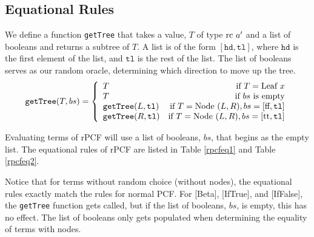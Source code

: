 \begin{table}
\begin{center}
\caption{Equational Rules For rPCF (Continued)} \label{rpcfeq2}
\end{center}
\end{table}

\subsection{Equational Rules}

We define a function \texttt{getTree} that takes a value, $T$ of type $\textrm{rc } a'$ and a list of booleans and returns a subtree of $T$.  A list is of the form $[\texttt{hd},\texttt{tl}]$, where $\texttt{hd}$ is the first element of the list, and $\texttt{tl}$ is the rest of the list.  The list of booleans serves as our random oracle, determining which direction to move up the tree.
\begin{displaymath}
	\texttt{getTree}(T, bs) = \left\{
		\begin{array}{lr}
			T & \textrm{if } T = \textrm{Leaf } x \\
			T & \textrm{if } bs \textrm{ is empty} \\
			\texttt{getTree}(L, \texttt{tl}) & \textrm{if } T = \textrm{Node }(L,R), bs = {[}\text{ff}, \texttt{tl}{]} \\
			\texttt{getTree}(R, \texttt{tl}) & \textrm{if } T = \textrm{Node }(L,R), bs = {[}\text{tt}, \texttt{tl}{]}
		\end{array}
	\right.		
\end{displaymath}

Evaluating terms of rPCF will use a list of booleans, $bs$, that begins as the empty list.  The equational rules of rPCF are listed in Table \ref{rpcfeq1} and Table \ref{rpcfeq2}.

Notice that for terms without random choice (without nodes), the equational rules exactly match the rules for normal PCF.  For [Beta], [IfTrue], and [IfFalse], the \texttt{getTree} function gets called, but if the list of booleans, $bs$, is empty, this has no effect.  The list of booleans only gets populated when determining the equality of terms with nodes.


